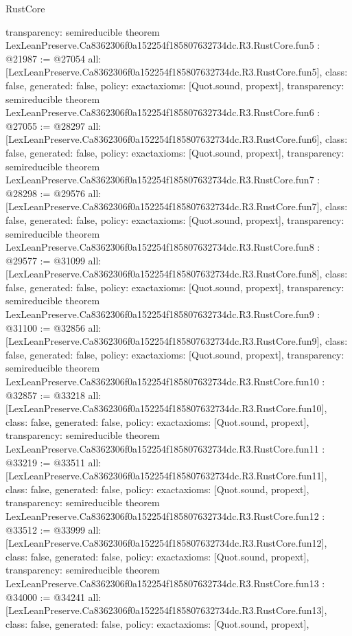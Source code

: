 \begin{lexlean}{RustCore}
\begin{coremodule}
{  transparency: semireducible
}
theorem LexLeanPreserve.Ca8362306f0a152254f185807632734dc.R3.RustCore.fun5 : @21987 := @27054 {
  all: [LexLeanPreserve.Ca8362306f0a152254f185807632734dc.R3.RustCore.fun5],
  class: false,
  generated: false,
  policy: exact{axioms: [Quot.sound, propext]},
  transparency: semireducible
}
theorem LexLeanPreserve.Ca8362306f0a152254f185807632734dc.R3.RustCore.fun6 : @27055 := @28297 {
  all: [LexLeanPreserve.Ca8362306f0a152254f185807632734dc.R3.RustCore.fun6],
  class: false,
  generated: false,
  policy: exact{axioms: [Quot.sound, propext]},
  transparency: semireducible
}
theorem LexLeanPreserve.Ca8362306f0a152254f185807632734dc.R3.RustCore.fun7 : @28298 := @29576 {
  all: [LexLeanPreserve.Ca8362306f0a152254f185807632734dc.R3.RustCore.fun7],
  class: false,
  generated: false,
  policy: exact{axioms: [Quot.sound, propext]},
  transparency: semireducible
}
theorem LexLeanPreserve.Ca8362306f0a152254f185807632734dc.R3.RustCore.fun8 : @29577 := @31099 {
  all: [LexLeanPreserve.Ca8362306f0a152254f185807632734dc.R3.RustCore.fun8],
  class: false,
  generated: false,
  policy: exact{axioms: [Quot.sound, propext]},
  transparency: semireducible
}
theorem LexLeanPreserve.Ca8362306f0a152254f185807632734dc.R3.RustCore.fun9 : @31100 := @32856 {
  all: [LexLeanPreserve.Ca8362306f0a152254f185807632734dc.R3.RustCore.fun9],
  class: false,
  generated: false,
  policy: exact{axioms: [Quot.sound, propext]},
  transparency: semireducible
}
theorem LexLeanPreserve.Ca8362306f0a152254f185807632734dc.R3.RustCore.fun10 : @32857 := @33218 {
  all: [LexLeanPreserve.Ca8362306f0a152254f185807632734dc.R3.RustCore.fun10],
  class: false,
  generated: false,
  policy: exact{axioms: [Quot.sound, propext]},
  transparency: semireducible
}
theorem LexLeanPreserve.Ca8362306f0a152254f185807632734dc.R3.RustCore.fun11 : @33219 := @33511 {
  all: [LexLeanPreserve.Ca8362306f0a152254f185807632734dc.R3.RustCore.fun11],
  class: false,
  generated: false,
  policy: exact{axioms: [Quot.sound, propext]},
  transparency: semireducible
}
theorem LexLeanPreserve.Ca8362306f0a152254f185807632734dc.R3.RustCore.fun12 : @33512 := @33999 {
  all: [LexLeanPreserve.Ca8362306f0a152254f185807632734dc.R3.RustCore.fun12],
  class: false,
  generated: false,
  policy: exact{axioms: [Quot.sound, propext]},
  transparency: semireducible
}
theorem LexLeanPreserve.Ca8362306f0a152254f185807632734dc.R3.RustCore.fun13 : @34000 := @34241 {
  all: [LexLeanPreserve.Ca8362306f0a152254f185807632734dc.R3.RustCore.fun13],
  class: false,
  generated: false,
  policy: exact{axioms: [Quot.sound, propext]},
}
\end{coremodule}
\end{lexlean}

